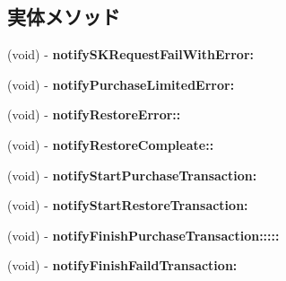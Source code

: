 \subsection*{実体メソッド}
\begin{DoxyCompactItemize}
\item 
\hypertarget{protocol_m_purchase_delegate-p_a1b61d4d2e5c97e89341e7bd3e861c0fc}{}(void) -\/ {\bfseries notify\+S\+K\+Request\+Fail\+With\+Error\+:}\label{protocol_m_purchase_delegate-p_a1b61d4d2e5c97e89341e7bd3e861c0fc}

\item 
\hypertarget{protocol_m_purchase_delegate-p_a42fe2eb1c8c3bca1fd579c6aa41afa84}{}(void) -\/ {\bfseries notify\+Purchase\+Limited\+Error\+:}\label{protocol_m_purchase_delegate-p_a42fe2eb1c8c3bca1fd579c6aa41afa84}

\item 
\hypertarget{protocol_m_purchase_delegate-p_aafa011a2c7dba1cc53dbbd387c3933f6}{}(void) -\/ {\bfseries notify\+Restore\+Error\+::}\label{protocol_m_purchase_delegate-p_aafa011a2c7dba1cc53dbbd387c3933f6}

\item 
\hypertarget{protocol_m_purchase_delegate-p_abbe19ca3fcbaf330078f6f98d1701028}{}(void) -\/ {\bfseries notify\+Restore\+Compleate\+::}\label{protocol_m_purchase_delegate-p_abbe19ca3fcbaf330078f6f98d1701028}

\item 
\hypertarget{protocol_m_purchase_delegate-p_a32cfff8fd3308617242aec0c3cef8e42}{}(void) -\/ {\bfseries notify\+Start\+Purchase\+Transaction\+:}\label{protocol_m_purchase_delegate-p_a32cfff8fd3308617242aec0c3cef8e42}

\item 
\hypertarget{protocol_m_purchase_delegate-p_ab636f40311088648d757b78ae3b2682b}{}(void) -\/ {\bfseries notify\+Start\+Restore\+Transaction\+:}\label{protocol_m_purchase_delegate-p_ab636f40311088648d757b78ae3b2682b}

\item 
\hypertarget{protocol_m_purchase_delegate-p_ae50a83c9183c9a30799e9ea64a02d5f8}{}(void) -\/ {\bfseries notify\+Finish\+Purchase\+Transaction\+:::::}\label{protocol_m_purchase_delegate-p_ae50a83c9183c9a30799e9ea64a02d5f8}

\item 
\hypertarget{protocol_m_purchase_delegate-p_a233c39eba24e2046d6ccad459a1b79a6}{}(void) -\/ {\bfseries notify\+Finish\+Faild\+Transaction\+:}\label{protocol_m_purchase_delegate-p_a233c39eba24e2046d6ccad459a1b79a6}


\end{DoxyCompactItemize}
